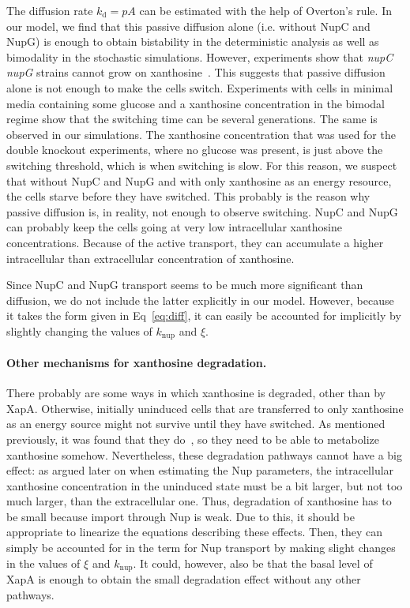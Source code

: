 \documentclass[10pt,letterpaper]{article}
\newcommand{\n}[1]{\mathrm{#1}}
\begin{document}
The diffusion rate $k_{\n{d}} = p A$ can be estimated with the help of
Overton's rule. In our model, we find that this passive diffusion alone
(i.e. without NupC and NupG) is enough to obtain bistability in the
deterministic analysis as well as bimodality in the stochastic simulations.
However, experiments show that \textDelta\emph{nupC} \textDelta\emph{nupG}
strains cannot grow on xanthosine~\cite{Norholm2001}. This suggests that
passive diffusion alone is not enough to make the cells switch. Experiments
with cells in minimal media containing some glucose and a xanthosine
concentration in the bimodal regime show that the switching time can be
several generations. The same is observed in our simulations. The xanthosine
concentration that was used for the double knockout experiments, where no
glucose was present, is just above the switching threshold, which is when
switching is slow. For this reason, we suspect that without NupC and NupG
and with only xanthosine as an energy resource, the cells starve before they
have switched. This probably is the reason why passive diffusion is, in
reality, not enough to observe switching. NupC and NupG can probably keep
the cells going at very low intracellular xanthosine concentrations. Because
of the active transport, they can accumulate a higher intracellular than
extracellular concentration of xanthosine.

Since NupC and NupG transport seems to be much more significant than
diffusion, we do not include the latter explicitly in our model. However,
because it takes the form given in Eq~\ref{eq:diff}, it can easily be
accounted for implicitly by slightly changing the values of $k_{\n{nup}}$
and $\xi$.

\paragraph*{Other mechanisms for xanthosine degradation.}
There probably are some ways in which xanthosine is degraded, other than by
XapA. Otherwise, initially uninduced cells that are transferred to only
xanthosine as an energy source might not survive until they have switched.
As mentioned previously, it was found that they do~\cite{Norholm2001}, so
they need to be able to metabolize xanthosine somehow. Nevertheless, these
degradation pathways cannot have a big effect: as argued later on when
estimating the Nup parameters, the intracellular xanthosine concentration in
the uninduced state must be a bit larger, but not too much larger, than the
extracellular one. Thus, degradation of xanthosine has to be small because
import through Nup is weak. Due to this, it should be appropriate to
linearize the equations describing these effects. Then, they can simply be
accounted for in the term for Nup transport by making slight changes in the
values of $\xi$ and $k_{\n{nup}}$. It could, however, also be that the basal
level of XapA is enough to obtain the small degradation effect without any
other pathways.
\end{document}
